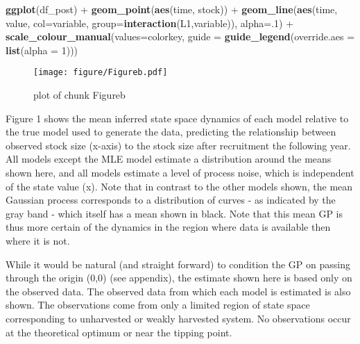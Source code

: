 \documentclass[author-year, review]{elsarticle} %
\makeatletter
\newenvironment{Shaded}{}{}
\newcommand{\KeywordTok}[1]{\textcolor[rgb]{0.00,0.44,0.13}{\textbf{{#1}}}}
\newcommand{\DataTypeTok}[1]{\textcolor[rgb]{0.56,0.13,0.00}{{#1}}}
\newcommand{\DecValTok}[1]{\textcolor[rgb]{0.25,0.63,0.44}{{#1}}}
\newcommand{\NormalTok}[1]{{#1}}
\def\maxwidth{\ifdim\Gin@nat@width>\linewidth\linewidth
\else\Gin@nat@width\fi}
\let\Oldincludegraphics\includegraphics
\renewcommand{\includegraphics}[1]{\Oldincludegraphics[width=\maxwidth]{#1}}
\makeatother
\begin{document}
\begin{Shaded}
\begin{Highlighting}[]
\KeywordTok{ggplot}\NormalTok{(df_post) + }\KeywordTok{geom_point}\NormalTok{(}\KeywordTok{aes}\NormalTok{(time, stock)) + }
  \KeywordTok{geom_line}\NormalTok{(}\KeywordTok{aes}\NormalTok{(time, value, }\DataTypeTok{col=}\NormalTok{variable, }\DataTypeTok{group=}\KeywordTok{interaction}\NormalTok{(L1,variable)), }\DataTypeTok{alpha=}\NormalTok{.}\DecValTok{1}\NormalTok{) + }
  \KeywordTok{scale_colour_manual}\NormalTok{(}\DataTypeTok{values=}\NormalTok{colorkey, }\DataTypeTok{guide =} \KeywordTok{guide_legend}\NormalTok{(}\DataTypeTok{override.aes =} \KeywordTok{list}\NormalTok{(}\DataTypeTok{alpha =} \DecValTok{1}\NormalTok{))) }
\end{Highlighting}
\end{Shaded}

\begin{figure}[htbp]
\centering
\texttt{[image: figure/Figureb.pdf]}
\caption{plot of chunk Figureb}
\end{figure}

Figure 1 shows the mean inferred state space dynamics of each model
relative to the true model used to generate the data, predicting the
relationship between observed stock size (x-axis) to the stock size
after recruitment the following year. All models except the MLE model
estimate a distribution around the means shown here, and all models
estimate a level of process noise, which is independent of the state
value (x). Note that in contrast to the other models shown, the mean
Gaussian process corresponds to a distribution of curves - as indicated
by the gray band - which itself has a mean shown in black. Note that
this mean GP is thus more certain of the dynamics in the region where
data is available then where it is not.

While it would be natural (and straight forward) to condition the GP on
passing through the origin (0,0) (see appendix), the estimate shown here
is based only on the observed data. The observed data from which each
model is estimated is also shown. The observations come from only a
limited region of state space corresponding to unharvested or weakly
harvested system. No observations occur at the theoretical optimum or
near the tipping point.
\end{document}
